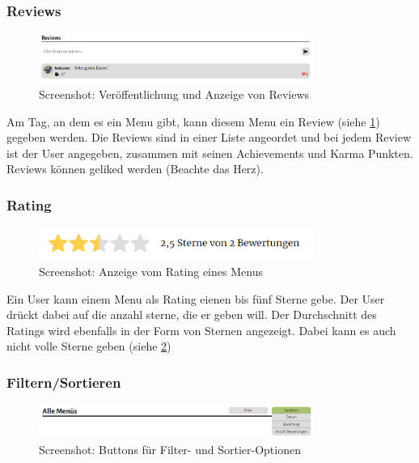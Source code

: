 \subsubsection*{Reviews}

\begin{figure}[ht]
    \centering
    \includegraphics[width=0.8\textwidth]{images/Resultat_Review.png}
    \caption{Screenshot: Veröffentlichung und Anzeige von Reviews}
    \label{fig:r-review}
\end{figure}

Am Tag, an dem es ein Menu gibt, kann diesem Menu ein Review (siehe \ref{fig:r-review}) gegeben werden. Die
Reviews sind in einer Liste angeordet und bei jedem Review ist der User
angegeben, zusammen mit seinen Achievements und Karma Punkten. Reviews können
geliked werden (Beachte das Herz).


\subsubsection*{Rating}

\begin{figure}[ht]
    \centering
    \includegraphics[width=0.8\textwidth]{images/Resultat_Rating.png}
    \caption{Screenshot: Anzeige vom Rating eines Menus}
    \label{fig:r-rating}
\end{figure}

Ein User kann einem Menu als Rating eienen bis fünf Sterne gebe. Der User drückt
dabei auf die anzahl sterne, die er geben will. Der Durchschnitt des Ratings
wird ebenfalls in der Form von Sternen angezeigt. Dabei kann es auch nicht volle
Sterne geben (siehe \ref{fig:r-rating}) 

\subsubsection*{Filtern/Sortieren}

\begin{figure}[ht]
    \centering
    \includegraphics[width=0.8\textwidth]{images/Resultat_Filter.png}
    \caption{Screenshot: Buttons für Filter- und Sortier-Optionen}
    \label{fig:r-filtersort}
\end{figure}

